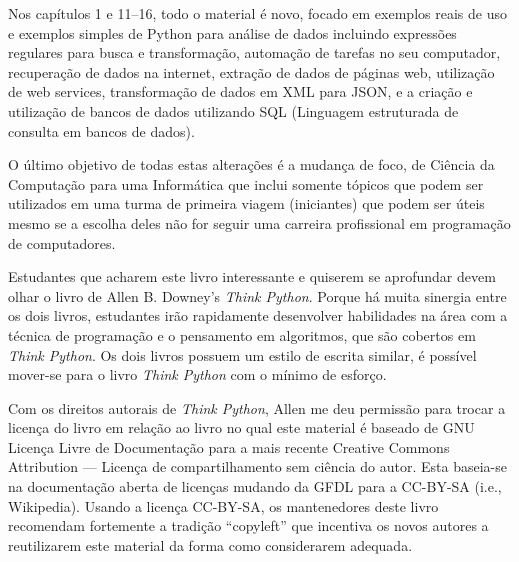 Nos capítulos 1 e 11--16, todo o material é novo, focado
em exemplos reais de uso e exemplos simples de Python para análise de dados
incluindo expressões regulares para busca e transformação,
automação de tarefas no seu computador, recuperação de dados na internet,
extração de dados de páginas web, utilização de web services, transformação
de dados em XML para JSON, e a criação e utilização de bancos de dados utilizando
SQL (Linguagem estruturada de consulta em bancos de dados).

O último objetivo de todas estas alterações é a mudança de foco, de
Ciência da Computação para uma Informática que inclui somente tópicos
que podem ser utilizados em uma turma de primeira viagem (iniciantes) que
podem ser úteis mesmo se a escolha deles não for seguir uma carreira
profissional em programação de computadores.

Estudantes que acharem este livro interessante e quiserem se aprofundar
devem olhar o livro de Allen B. Downey's \emph{Think Python}. Porque há
muita sinergia entre os dois livros, estudantes irão rapidamente desenvolver
habilidades na área com a técnica de programação e o pensamento
em algoritmos, que são cobertos em \emph{Think Python}.
Os dois livros possuem um estilo de escrita similar, é possível
mover-se para o livro \emph{Think Python} com o mínimo de esforço.

Com os direitos autorais de \emph{Think Python},
Allen me deu permissão para trocar a licença do livro
em relação ao livro no qual este material é baseado de 
GNU Licença Livre de Documentação para a mais recente
Creative Commons Attribution --- Licença de compartilhamento sem 
ciência do autor.
Esta baseia-se na documentação aberta de licenças mudando da GFDL
para a CC-BY-SA (i.e., Wikipedia).
Usando a licença CC-BY-SA, os mantenedores deste livro recomendam
fortemente a tradição ``copyleft'' que incentiva os novos autores
a reutilizarem este material da forma como considerarem adequada.

